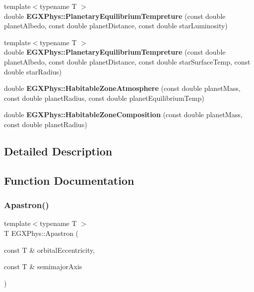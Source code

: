 \begin{DoxyCompactItemize}
\item 
\mbox{\label{group___astrophysics_gaa428f551c34387a00d6c376b3f33632b}} 
{\footnotesize template$<$typename T $>$ }\\double {\bfseries E\+G\+X\+Phys\+::\+Planetary\+Equilibrium\+Tempreture} (const double planet\+Albedo, const double planet\+Distance, const double star\+Luminosity)
\item 
\mbox{\label{group___astrophysics_ga387b915a2eb48bda3fe8bfc369bb564c}} 
{\footnotesize template$<$typename T $>$ }\\double {\bfseries E\+G\+X\+Phys\+::\+Planetary\+Equilibrium\+Tempreture} (const double planet\+Albedo, const double planet\+Distance, const double star\+Surface\+Temp, const double star\+Radius)
\item 
\mbox{\label{group___astrophysics_ga9829bd56a145bd0ef17b38c6f8006f66}} 
double {\bfseries E\+G\+X\+Phys\+::\+Habitable\+Zone\+Atmosphere} (const double planet\+Mass, const double planet\+Radius, const double planet\+Equilibrium\+Temp)
\item 
\mbox{\label{group___astrophysics_ga216592494ebf26b017c36af156c4d14b}} 
double {\bfseries E\+G\+X\+Phys\+::\+Habitable\+Zone\+Composition} (const double planet\+Mass, const double planet\+Radius)
\end{DoxyCompactItemize}


\subsection{Detailed Description}


\subsection{Function Documentation}
\mbox{\label{group___astrophysics_ga2fc1c406ce10f59b4f325150aecd279a}} 
\subsubsection{\texorpdfstring{Apastron()}{Apastron()}}
{\footnotesize\ttfamily template$<$typename T $>$ \\
T E\+G\+X\+Phys\+::\+Apastron (\begin{DoxyParamCaption}\item[{const T \&}]{orbital\+Eccentricity,  }\item[{const T \&}]{semimajor\+Axis }\end{DoxyParamCaption})}



